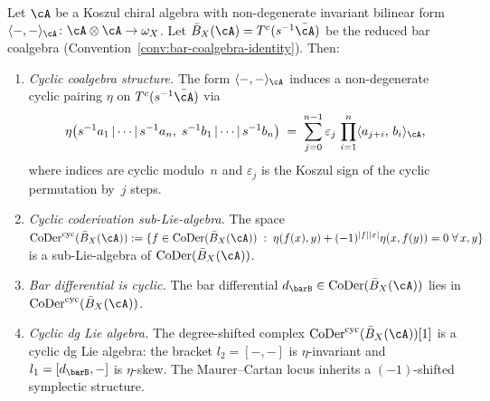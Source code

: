 \begin{proposition}\label{prop:genus0-cyclic-coderivation}
Let $\cA$ be a Koszul chiral algebra with non-degenerate
invariant bilinear form
$\langle{-},{-}\rangle_{\cA}\colon \cA\otimes\cA\to\omega_X$.
Let $\bar{B}_X(\cA) = T^c(s^{-1}\bar{\cA})$ be the reduced bar
coalgebra
\textup{(}Convention~\textup{\ref{conv:bar-coalgebra-identity}}\textup{)}.
Then:
\begin{enumerate}[label=\textup{(\roman*)}]
\item \emph{Cyclic coalgebra structure.}
 The form $\langle{-},{-}\rangle_{\cA}$ induces a non-degenerate
 cyclic pairing $\eta$ on $T^c(s^{-1}\bar{\cA})$ via
 \begin{equation}\label{eq:cyclic-coalgebra-pairing}
 \eta\bigl(s^{-1}a_1\,|\cdots|\,s^{-1}a_n,\;
 s^{-1}b_1\,|\cdots|\,s^{-1}b_n\bigr)
 \;=\;
 \sum_{j=0}^{n-1}\varepsilon_j\,
 \prod_{i=1}^{n}
 \langle a_{j+i},\,b_i\rangle_{\cA},
 \end{equation}
 where indices are cyclic modulo~$n$ and $\varepsilon_j$ is
 the Koszul sign of the cyclic permutation by~$j$ steps.

\item \emph{Cyclic coderivation sub-Lie-algebra.}
 The space
 $\operatorname{CoDer}^{\mathrm{cyc}}(\bar{B}_X(\cA))
 := \{f\in\operatorname{CoDer}(\bar{B}_X(\cA))\;:\;
 \eta(f(x),y)+(-1)^{|f||x|}\eta(x,f(y))=0\;\forall\,x,y\}$
 is a sub-Lie-algebra of
 $\operatorname{CoDer}(\bar{B}_X(\cA))$.

\item \emph{Bar differential is cyclic.}
 The bar differential $d_{\barB}\in
 \operatorname{CoDer}(\bar{B}_X(\cA))$ lies in
 $\operatorname{CoDer}^{\mathrm{cyc}}(\bar{B}_X(\cA))$.

\item \emph{Cyclic dg Lie algebra.}
 The degree-shifted complex
 $\operatorname{CoDer}^{\mathrm{cyc}}(\bar{B}_X(\cA))[1]$
 is a cyclic dg Lie algebra: the bracket $l_2 = [-,-]$
 is $\eta$-invariant and $l_1 = [d_{\barB},-]$ is
 $\eta$-skew. The Maurer--Cartan locus inherits a
 $(-1)$-shifted symplectic structure.
\end{enumerate}
\end{proposition}

